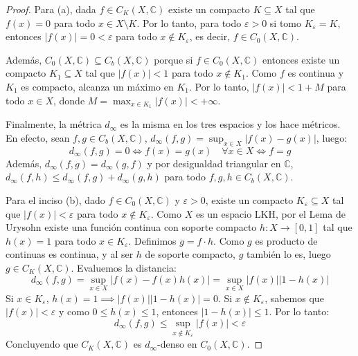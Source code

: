 \documentclass{article}
\theoremstyle{plain}
\theoremstyle{definition}
\begin{document}
\begin{proof}
    Para (a), dada \( f \in C_{K}(X, \mathbb{C}) \) existe un compacto \( K \subseteq X \) tal que \( f(x) = 0 \) para todo \( x \in X \setminus K \). Por lo tanto, para todo \( \varepsilon > 0 \) si tomo \( K_\varepsilon = K \), entonces
    \( |f(x)| = 0 < \varepsilon \) para todo \( x \notin K_\varepsilon \), es decir, \( f \in C_{0}(X, \mathbb{C}) \).

    Además, \( C_{0}(X, \mathbb{C}) \subseteq C_{b}(X, \mathbb{C}) \) porque si \( f \in C_{0}(X, \mathbb{C}) \) entonces existe un compacto \( K_1 \subseteq X \) tal que \( |f(x)| < 1 \) para todo \( x \notin K_1 \).
    Como \( f \) es continua y \( K_1 \) es compacto, alcanza un máximo en \( K_1 \). Por lo tanto, \( |f(x)| < 1 + M \) para todo \( x \in X \), donde \( M = \max_{x\in K_1} |f(x)| < +\infty \).

    Finalmente, la métrica \( d_{\infty} \) es la misma en los tres espacios y los hace métricos. En efecto, sean \( f, g \in C_b(X, \mathbb{C}) \), \( d_{\infty}(f,g) = \sup_{x \in X} |f(x) - g(x)| \), luego:
    \[
        d_{\infty}(f,g) = 0 \iff f(x) = g(x) \quad \forall x \in X \iff f = g
    \]
    Además, \( d_{\infty}(f,g) = d_{\infty}(g,f) \) y por desigualdad triangular en \( \mathbb{C} \), \( d_{\infty}(f,h) \le d_{\infty}(f,g) + d_{\infty}(g,h) \) para todo \( f, g, h \in C_b(X, \mathbb{C}) \).

    Para el inciso (b), dado \( f \in C_0(X, \mathbb{C}) \) y \( \varepsilon > 0 \), existe un compacto \( K_\varepsilon \subseteq X \) tal que \( |f(x)| < \varepsilon \) para todo \( x \notin K_\varepsilon \).
    Como \( X \) es un espacio LKH, por el Lema de Urysohn existe una función continua con soporte compacto \( h: X \to [0,1] \) tal que \( h(x) = 1 \) para todo \( x \in K_\varepsilon \).
    Definimos \( g = f \cdot h \). Como \( g \) es producto de continuas es continua, y al ser \( h \) de soporte compacto, \( g \) también lo es, luego \( g \in C_K(X, \mathbb{C}) \). Evaluemos la distancia:
    \[
        d_{\infty}(f,g) = \sup_{x\in X} |f(x) - f(x)h(x)| = \sup_{x\in X} |f(x)| |1 - h(x)|
    \]
    Si \( x \in K_\varepsilon \), \( h(x) = 1 \implies |f(x)||1 - h(x)| = 0 \). Si \( x \notin K_\varepsilon \), sabemos que \( |f(x)| < \varepsilon \) y como \( 0 \le h(x) \le 1 \), entonces \( |1 - h(x)| \le 1 \). Por lo tanto:
    \[
        d_{\infty}(f,g) \le \sup_{x \notin K_\varepsilon} |f(x)| < \varepsilon
    \]
    Concluyendo que \( C_K(X, \mathbb{C}) \) es \( d_{\infty} \)-denso en \( C_0(X, \mathbb{C}) \).


\end{proof}
\end{document}
